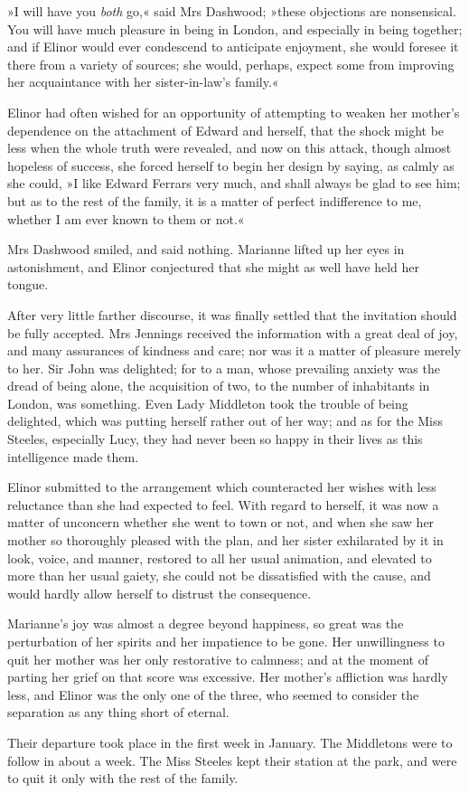 »I will have you \textit{both} go,« said Mrs Dashwood; »these objections are nonsensical. You will have much pleasure in being in London, and especially in being together; and if Elinor would ever condescend to anticipate enjoyment, she would foresee it there from a variety of sources; she would, perhaps, expect some from improving her acquaintance with her sister-in-law’s family.«

Elinor had often wished for an opportunity of attempting to weaken her mother’s dependence on the attachment of Edward and herself, that the shock might be less when the whole truth were revealed, and now on this attack, though almost hopeless of success, she forced herself to begin her design by saying, as calmly as she could, »I like Edward Ferrars very much, and shall always be glad to see him; but as to the rest of the family, it is a matter of perfect indifference to me, whether I am ever known to them or not.«

Mrs Dashwood smiled, and said nothing. Marianne lifted up her eyes in astonishment, and Elinor conjectured that she might as well have held her tongue.

After very little farther discourse, it was finally settled that the invitation should be fully accepted. Mrs Jennings received the information with a great deal of joy, and many assurances of kindness and care; nor was it a matter of pleasure merely to her. Sir John was delighted; for to a man, whose prevailing anxiety was the dread of being alone, the acquisition of two, to the number of inhabitants in London, was something. Even Lady Middleton took the trouble of being delighted, which was putting herself rather out of her way; and as for the Miss Steeles, especially Lucy, they had never been so happy in their lives as this intelligence made them.

Elinor submitted to the arrangement which counteracted her wishes with less reluctance than she had expected to feel. With regard to herself, it was now a matter of unconcern whether she went to town or not, and when she saw her mother so thoroughly pleased with the plan, and her sister exhilarated by it in look, voice, and manner, restored to all her usual animation, and elevated to more than her usual gaiety, she could not be dissatisfied with the cause, and would hardly allow herself to distrust the consequence.

Marianne’s joy was almost a degree beyond happiness, so great was the perturbation of her spirits and her impatience to be gone. Her unwillingness to quit her mother was her only restorative to calmness; and at the moment of parting her grief on that score was excessive. Her mother’s affliction was hardly less, and Elinor was the only one of the three, who seemed to consider the separation as any thing short of eternal.

Their departure took place in the first week in January. The Middletons were to follow in about a week. The Miss Steeles kept their station at the park, and were to quit it only with the rest of the family.